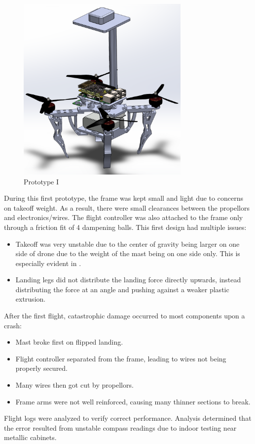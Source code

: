 \documentclass{article}
\begin{document}
\begin{figure}[h!]
  \begin{center} 
  \caption{Prototype I}
  \label{fig:PrototypeI}
        \includegraphics[width=0.75\textwidth]{Reflection/PrototypeI.png}
  \end{center}
\end{figure}

During this first prototype, the frame was kept small and light due to concerns on takeoff weight. As a result, there were small clearances between the propellors and electronics/wires. The flight controller was also attached to the frame only through a friction fit of 4 dampening balls. 
This first design had multiple issues:
\begin{itemize}
    \item Takeoff was very unstable due to the center of gravity being larger on one side of drone due to the weight of the mast being on one side only. This is especially evident in .
    \item Landing legs did not distribute the landing force directly upwards, instead distributing the force at an angle and pushing against a weaker plastic extrusion.
\end{itemize}
After the first flight, catastrophic damage occurred to most components upon a crash:
\begin{itemize}
    \item Mast broke first on flipped landing.
    \item Flight controller separated from the frame, leading to wires not being properly secured.
    \item Many wires then got cut by propellors.
    \item Frame arms were not well reinforced, causing many thinner sections to break.
\end{itemize}
Flight logs were analyzed to verify correct performance. Analysis determined that the error resulted from unstable compass readings due to indoor testing near metallic cabinets. 
\end{document}
